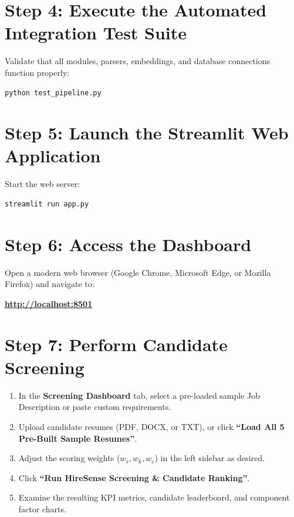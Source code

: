 \documentclass[12pt,a4paper]{report}
\begin{document}
\section*{Step 4: Execute the Automated Integration Test Suite}
Validate that all modules, parsers, embeddings, and database connections function properly:
\begin{lstlisting}[language=bash]
python test_pipeline.py
\end{lstlisting}

\section*{Step 5: Launch the Streamlit Web Application}
Start the web server:
\begin{lstlisting}[language=bash]
streamlit run app.py
\end{lstlisting}

\section*{Step 6: Access the Dashboard}
Open a modern web browser (Google Chrome, Microsoft Edge, or Mozilla Firefox) and navigate to:
\begin{center}
\textbf{\url{http://localhost:8501}}
\end{center}

\section*{Step 7: Perform Candidate Screening}
\begin{enumerate}
    \item In the \textbf{Screening Dashboard} tab, select a pre-loaded sample Job Description or paste custom requirements.
    \item Upload candidate resumes (PDF, DOCX, or TXT), or click \textbf{``Load All 5 Pre-Built Sample Resumes''}.
    \item Adjust the scoring weights ($w_s, w_k, w_e$) in the left sidebar as desired.
    \item Click \textbf{``Run HireSense Screening \& Candidate Ranking''}.
    \item Examine the resulting KPI metrics, candidate leaderboard, and component factor charts.
\end{enumerate}
\end{document}
